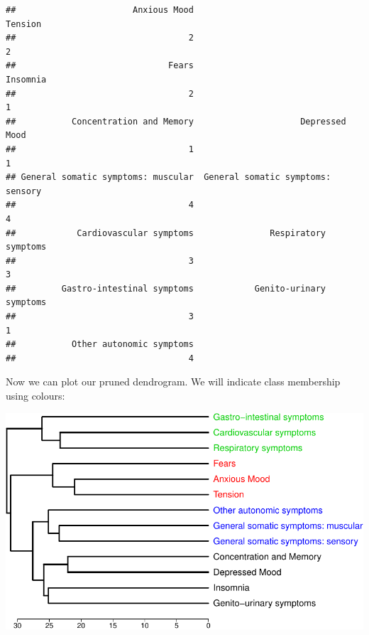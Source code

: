 \documentclass[
]{book}
\newenvironment{Shaded}{\begin{snugshade}}{\end{snugshade}}
\newcommand{\AttributeTok}[1]{\textcolor[rgb]{0.77,0.63,0.00}{#1}}
\newcommand{\DecValTok}[1]{\textcolor[rgb]{0.00,0.00,0.81}{#1}}
\newcommand{\FloatTok}[1]{\textcolor[rgb]{0.00,0.00,0.81}{#1}}
\newcommand{\FunctionTok}[1]{\textcolor[rgb]{0.00,0.00,0.00}{#1}}
\newcommand{\NormalTok}[1]{#1}
\newcommand{\OtherTok}[1]{\textcolor[rgb]{0.56,0.35,0.01}{#1}}
\newcommand{\SpecialCharTok}[1]{\textcolor[rgb]{0.00,0.00,0.00}{#1}}
\begin{document}
\begin{verbatim}
##                       Anxious Mood                            Tension 
##                                  2                                  2 
##                              Fears                           Insomnia 
##                                  2                                  1 
##           Concentration and Memory                     Depressed Mood 
##                                  1                                  1 
## General somatic symptoms: muscular  General somatic symptoms: sensory 
##                                  4                                  4 
##            Cardiovascular symptoms               Respiratory symptoms 
##                                  3                                  3 
##         Gastro-intestinal symptoms            Genito-urinary symptoms 
##                                  3                                  1 
##           Other autonomic symptoms 
##                                  4
\end{verbatim}

Now we can plot our pruned dendrogram. We will indicate class membership using colours:

\begin{Shaded}
\end{Shaded}

\includegraphics{DZP_R_bookdown_files/figure-latex/unnamed-chunk-20-1.pdf}
\end{document}
